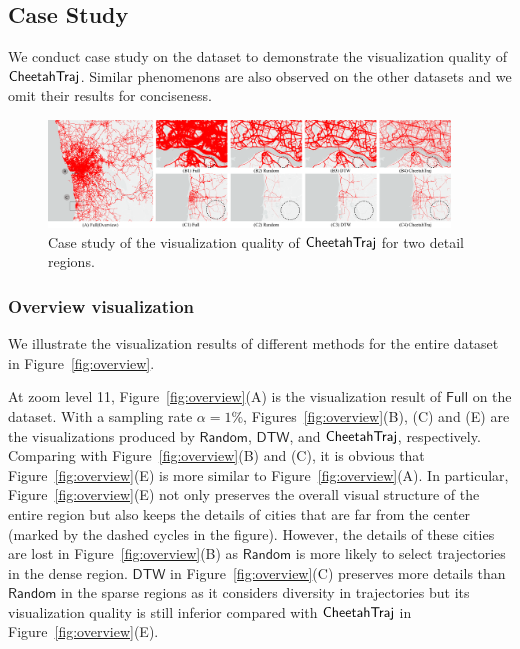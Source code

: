 \subsection{Case Study}\label{sec:case}

We conduct case study on the \pt{} dataset to demonstrate the visualization quality of $\mathsf{CheetahTraj}$. Similar phenomenons are also observed on the other datasets and we omit their results for conciseness.

\begin{figure}[t]
	\centering
	\includegraphics[width=0.95\textwidth]{pictures/case_study_icde/case_study_detail.pdf}
	\trim
	\caption{Case study of the visualization quality of $\mathsf{CheetahTraj}$ for two detail regions.}
	\label{fig:detailview}
	\trim \trim
\end{figure}

\subsubsection{Overview visualization}

We illustrate the visualization results of different methods for the entire \pt{} dataset in Figure~\ref{fig:overview}.

At zoom level 11, Figure~\ref{fig:overview}(A) is the visualization result of $\mathsf{Full}$ on the \pt{} dataset.
With a sampling rate $\alpha \!=\! 1\%$, Figures~\ref{fig:overview}(B), (C) and (E) are the visualizations produced by $\mathsf{Random}$, $\mathsf{DTW}$,
and $\mathsf{CheetahTraj}$, respectively. Comparing with Figure~\ref{fig:overview}(B) and (C), it is obvious that Figure~\ref{fig:overview}(E) is more similar to Figure~\ref{fig:overview}(A). In particular, Figure~\ref{fig:overview}(E) not only preserves the overall visual structure of the entire region but also keeps the details of cities that are far from the center (marked by the dashed cycles in the figure). However, the details of these cities are lost in Figure~\ref{fig:overview}(B) as $\mathsf{Random}$ is more likely to select trajectories in the dense region. $\mathsf{DTW}$ in Figure~\ref{fig:overview}(C) preserves more details than $\mathsf{Random}$ in the sparse regions as it considers diversity in trajectories but its visualization quality is still inferior compared with $\mathsf{CheetahTraj}$ in Figure~\ref{fig:overview}(E).

